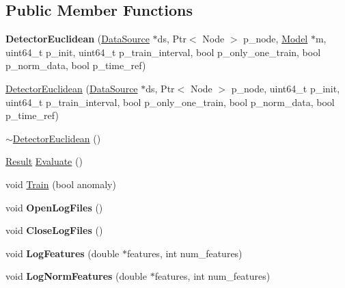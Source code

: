 \subsection*{Public Member Functions}
\begin{DoxyCompactItemize}
\item 
\hypertarget{classDetectorEuclidean_a2a7588db4d1b5ddad59ad75ff044dfa2}{}{\bfseries Detector\+Euclidean} (\hyperlink{classDataSource}{Data\+Source} $\ast$ds, Ptr$<$ Node $>$ p\+\_\+node, \hyperlink{classModel}{Model} $\ast$m, uint64\+\_\+t p\+\_\+init, uint64\+\_\+t p\+\_\+train\+\_\+interval, bool p\+\_\+only\+\_\+one\+\_\+train, bool p\+\_\+norm\+\_\+data, bool p\+\_\+time\+\_\+ref)\label{classDetectorEuclidean_a2a7588db4d1b5ddad59ad75ff044dfa2}

\item 
\hyperlink{classDetectorEuclidean_acf39a526724307f8ceb9c3c4cc7550a8}{Detector\+Euclidean} (\hyperlink{classDataSource}{Data\+Source} $\ast$ds, Ptr$<$ Node $>$ p\+\_\+node, uint64\+\_\+t p\+\_\+init, uint64\+\_\+t p\+\_\+train\+\_\+interval, bool p\+\_\+only\+\_\+one\+\_\+train, bool p\+\_\+norm\+\_\+data, bool p\+\_\+time\+\_\+ref)
\item 
\hyperlink{classDetectorEuclidean_ab148b531d1c0ae8b459b6d42bf3b2221}{$\sim$\+Detector\+Euclidean} ()
\item 
\hyperlink{structResult}{Result} \hyperlink{classDetectorEuclidean_aa6dd14b9caad9b551aae97db2b52655f}{Evaluate} ()
\item 
void \hyperlink{classDetectorEuclidean_ab925bf1423f99478e3b57727ade60940}{Train} (bool anomaly)
\item 
\hypertarget{classDetectorEuclidean_a53cfe152d162e3c3dade24c5ac1e6d5f}{}void {\bfseries Open\+Log\+Files} ()\label{classDetectorEuclidean_a53cfe152d162e3c3dade24c5ac1e6d5f}

\item 
\hypertarget{classDetectorEuclidean_a80d5ebd3be8346aefc1d9aabef6963c9}{}void {\bfseries Close\+Log\+Files} ()\label{classDetectorEuclidean_a80d5ebd3be8346aefc1d9aabef6963c9}

\item 
\hypertarget{classDetectorEuclidean_a78fb0e7a0130a2d9124b85000becac3a}{}void {\bfseries Log\+Features} (double $\ast$features, int num\+\_\+features)\label{classDetectorEuclidean_a78fb0e7a0130a2d9124b85000becac3a}

\item 
\hypertarget{classDetectorEuclidean_a56459a2dfe4bd7127c42cb078431f33e}{}void {\bfseries Log\+Norm\+Features} (double $\ast$features, int num\+\_\+features)\label{classDetectorEuclidean_a56459a2dfe4bd7127c42cb078431f33e}


\end{DoxyCompactItemize}

